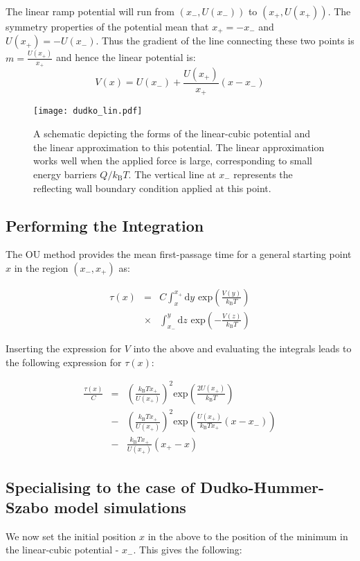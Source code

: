 \documentclass[twocolumn,pre,aps,showpacs,a4paper,floatfix,amssymb]{revtex4-1}
\begin{document}
The linear ramp potential will run from $(x_-, U(x_-))$ to $(x_+, U(x_+))$. The symmetry properties of the potential mean that $x_+ = -x_-$ and $U(x_+) = - U(x_-)$. Thus the gradient of the line connecting these two points is $m = \frac{U(x_+)}{x_+}$ and hence the linear potential is:
\begin{equation}
V(x) = U(x_-)+ \frac{U(x_+)}{x_+}(x-x_-)
\end{equation}

\begin{figure}[h]
\texttt{[image: dudko\_lin.pdf]}
\caption{A schematic depicting the forms of the linear-cubic potential and the linear approximation to this potential. The linear approximation works well when the applied force is large, corresponding to small energy barriers $Q/k_\text{B}T$. The vertical line at $x_-$ represents the reflecting wall boundary condition applied at this point.}
\label{fig:linearised}
\end{figure}


\subsection{Performing the Integration}
The OU method provides the mean first-passage time for a general starting point $x$ in the region $(x_-,x_+)$ as:

\begin{eqnarray}
\tau(x) &=& C\int_{x}^{x_+} \text{d}y \text{ exp}\left(\frac{V(y)}{k_\text{B}T}\right) \nonumber \\ &\times& \int_{x_-}^y \text{d}z \text{ exp}\left(-\frac{V(z)}{k_\text{B}T}\right)
\end{eqnarray}

\noindent Inserting the expression for $V$ into the above and evaluating the integrals leads to the following expression for $\tau(x)$:

\begin{eqnarray}
\frac{\tau(x)}{C} &=& \left(\frac{k_\text{B}Tx_+}{U(x_+)}\right)^2 \text{exp}\left(\frac{2U(x_+)}{k_\text{B}T}\right)\nonumber \\ &-& \left(\frac{k_\text{B}Tx_+}{U(x_+)}\right)^2\text{exp}\left(\frac{U(x_+)}{k_\text{B}Tx_+}(x-x_-)\right) \nonumber \\ &-& \frac{k_\text{B}Tx_+}{U(x_+)} (x_+-x)
\end{eqnarray}

\subsection{Specialising to the case of Dudko-Hummer-Szabo model simulations}
We now set the initial position $x$ in the above to the position of the minimum in the linear-cubic potential - $x_-$. This gives the following:
\end{document}
